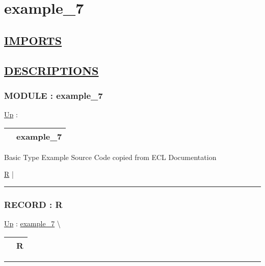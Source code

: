 \chapter*{example\_7}
\hypertarget{ecldoc:toc:example_7}{}

\section*{\underline{IMPORTS}}

\section*{\underline{DESCRIPTIONS}}
\subsection*{MODULE : example\_7}
\hypertarget{ecldoc:example_7}{}
\hyperlink{ecldoc:toc:root}{Up} :

{\renewcommand{\arraystretch}{1.5}
\begin{tabularx}{\textwidth}{|>{\raggedright\arraybackslash}l|X|}
\hline
\hspace{0pt} & example\_7 \\
\hline
\end{tabularx}
}

\par
Basic Type Example Source Code copied from ECL Documentation


\hyperlink{ecldoc:example_7.r}{R}  |

\rule{\linewidth}{0.5pt}

\subsection*{RECORD : R}
\hypertarget{ecldoc:example_7.r}{}
\hyperlink{ecldoc:example_7}{Up} :
\hspace{0pt} \hyperlink{ecldoc:example_7}{example_7} \textbackslash 

{\renewcommand{\arraystretch}{1.5}
\begin{tabularx}{\textwidth}{|>{\raggedright\arraybackslash}l|X|}
\hline
\hspace{0pt} & R \\
\hline
\end{tabularx}
}

\par


\rule{\linewidth}{0.5pt}


